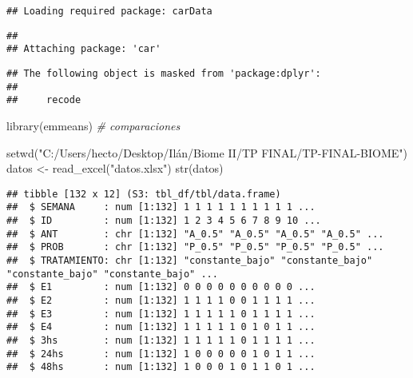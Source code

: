 \documentclass[
]{article}
\newenvironment{Shaded}{\begin{snugshade}}{\end{snugshade}}
\newcommand{\CommentTok}[1]{\textcolor[rgb]{0.56,0.35,0.01}{\textit{#1}}}
\newcommand{\FunctionTok}[1]{\textcolor[rgb]{0.00,0.00,0.00}{#1}}
\newcommand{\NormalTok}[1]{#1}
\newcommand{\OtherTok}[1]{\textcolor[rgb]{0.56,0.35,0.01}{#1}}
\newcommand{\SpecialCharTok}[1]{\textcolor[rgb]{0.00,0.00,0.00}{#1}}
\newcommand{\StringTok}[1]{\textcolor[rgb]{0.31,0.60,0.02}{#1}}
\begin{document}
\begin{verbatim}
## Loading required package: carData
\end{verbatim}

\begin{verbatim}
## 
## Attaching package: 'car'
\end{verbatim}

\begin{verbatim}
## The following object is masked from 'package:dplyr':
## 
##     recode
\end{verbatim}

\begin{Shaded}
\begin{Highlighting}[]
\FunctionTok{library}\NormalTok{(emmeans)   }\CommentTok{\# comparaciones}


\FunctionTok{setwd}\NormalTok{(}\StringTok{"C:/Users/hecto/Desktop/Ilán/Biome II/TP FINAL/TP{-}FINAL{-}BIOME"}\NormalTok{)}
\NormalTok{datos }\OtherTok{\textless{}{-}} \FunctionTok{read\_excel}\NormalTok{(}\StringTok{"datos.xlsx"}\NormalTok{)}
\FunctionTok{str}\NormalTok{(datos)}
\end{Highlighting}
\end{Shaded}

\begin{verbatim}
## tibble [132 x 12] (S3: tbl_df/tbl/data.frame)
##  $ SEMANA     : num [1:132] 1 1 1 1 1 1 1 1 1 1 ...
##  $ ID         : num [1:132] 1 2 3 4 5 6 7 8 9 10 ...
##  $ ANT        : chr [1:132] "A_0.5" "A_0.5" "A_0.5" "A_0.5" ...
##  $ PROB       : chr [1:132] "P_0.5" "P_0.5" "P_0.5" "P_0.5" ...
##  $ TRATAMIENTO: chr [1:132] "constante_bajo" "constante_bajo" "constante_bajo" "constante_bajo" ...
##  $ E1         : num [1:132] 0 0 0 0 0 0 0 0 0 0 ...
##  $ E2         : num [1:132] 1 1 1 1 0 0 1 1 1 1 ...
##  $ E3         : num [1:132] 1 1 1 1 1 0 1 1 1 1 ...
##  $ E4         : num [1:132] 1 1 1 1 1 0 1 0 1 1 ...
##  $ 3hs        : num [1:132] 1 1 1 1 1 0 1 1 1 1 ...
##  $ 24hs       : num [1:132] 1 0 0 0 0 0 1 0 1 1 ...
##  $ 48hs       : num [1:132] 1 0 0 0 1 0 1 1 0 1 ...
\end{verbatim}

\begin{Shaded}
\end{Shaded}
\end{document}
